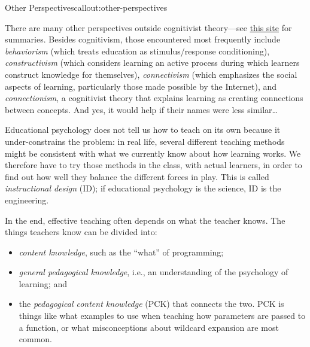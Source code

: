 \begin{callout}{Other Perspectives}{callout:other-perspectives}

There are many other perspectives outside cognitivist theory---see
\href{http://www.learning-theories.com/}{this site} for summaries.
Besides cognitivism, those encountered most frequently include
\emph{behaviorism} (which treats education as stimulus/response
conditioning), \emph{constructivism} (which considers learning an active
process during which learners construct knowledge for themselves),
\emph{connectivism} (which emphasizes the social aspects of learning,
particularly those made possible by the Internet), and
\emph{connectionism}, a cognitivist theory that explains learning as
creating connections between concepts. And yes, it would help if their
names were less similar\ldots{}
\end{callout}


Educational psychology does not tell us how to teach on its own because
it under-constrains the problem: in real life, several different
teaching methods might be consistent with what we currently know about
how learning works. We therefore have to try those methods in the class,
with actual learners, in order to find out how well they balance the
different forces in play. This is called \emph{instructional design}
(ID); if educational psychology is the science, ID is the engineering.


In the end, effective teaching often depends on what the teacher knows.
The things teachers know can be divided into:

\begin{itemize}
\item
  \emph{content knowledge}, such as the ``what'' of programming;
\item
  \emph{general pedagogical knowledge}, i.e., an understanding of the
  psychology of learning; and
\item
  the \emph{pedagogical content knowledge} (PCK) that connects the two.
  PCK is things like what examples to use when teaching how parameters
  are passed to a function, or what misconceptions about wildcard
  expansion are most common.
\end{itemize}


